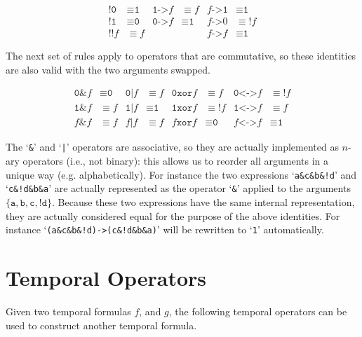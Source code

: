 \documentclass[a4paper,twoside,10pt,DIV=12]{scrreprt}
\DeclareMathOperator{\NOT}{\texttt{!}}
\newcommand{\XOR}{\mathbin{\texttt{xor}}}
\newcommand{\IMPLIES}{\mathbin{\texttt{->}}}
\newcommand{\EQUIV}{\mathbin{\texttt{<->}}}
\newcommand{\OR}{\mathbin{\texttt{|}}}
\newcommand{\AND}{\mathbin{\texttt{\&}}}
\newcommand{\0}{\texttt{0}}
\newcommand{\1}{\texttt{1}}
\newcommand\code[1]{\texttt{#1}}
\newcommand\samp[1]{`\texttt{#1}'}
\begin{document}
\begin{align*}
  \NOT \0 &\equiv \1 &
  \1\IMPLIES f &\equiv f &
  f\IMPLIES\1 &\equiv \1 \\
  \NOT\1 &\equiv \0 &
  \0\IMPLIES f &\equiv \1&
  f \IMPLIES 0 &\equiv \NOT f \\
  \NOT\NOT f &\equiv f &
  && f\IMPLIES f &\equiv \1
\end{align*}

The next set of rules apply to operators that are commutative, so
these identities are also valid with the two arguments swapped.

\begin{align*}
  \0\AND f   &\equiv \0 &
  \0\OR f &\equiv f&
  \0\XOR f &\equiv f &
  \0\EQUIV f &\equiv \NOT f \\
  \1\AND f   &\equiv f &
  \1\OR f &\equiv \1 &
  \1\XOR f &\equiv \NOT f&
  \1\EQUIV f &\equiv f \\
  f\AND f &\equiv f &
  f\OR f &\equiv f &
  f\XOR f &\equiv \0&
  f\EQUIV f &\equiv \1
\end{align*}

The \samp{\&} and \samp{|} operators are associative, so they are
actually implemented as $n$-ary operators (i.e., not binary): this
allows us to reorder all arguments in a unique way
(e.g. alphabetically).  For instance the two expressions
\samp{a\&c\&b\&!d} and \samp{c\&!d\&b\&a} are actually represented as
the operator \samp{\&} applied to the arguments
$\{\code{a},\code{b},\code{c},\code{!d}\}$.  Because these two
expressions have the same internal representation, they are actually
considered equal for the purpose of the above identities.  For
instance \samp{(a\&c\&b\&!d)->(c\&!d\&b\&a)} will be rewritten to
\samp{1} automatically.

\section{Temporal Operators}\label{sec:ltlops}

Given two temporal formulas $f$, and $g$, the following
temporal operators can be used to construct another temporal formula.
\end{document}
